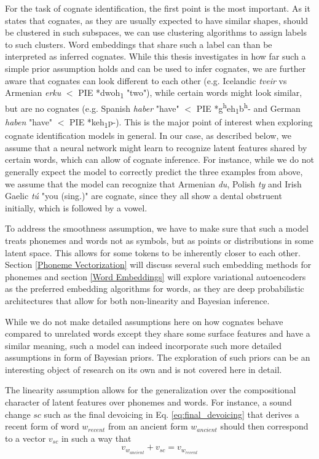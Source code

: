 \documentclass[6pt]{article}
\begin{document}
For the task of cognate identification, the first point is the most important. As it states that cognates, as they are usually expected to have similar shapes, should be clustered in such subspaces, we can use clustering algorithms to assign labels to such clusters. Word embeddings that share such a label can than be interpreted as inferred cognates. While this thesis investigates in how far such a simple prior assumption holds and can be used to infer cognates, we are further aware that cognates can look different to each other (e.g. Icelandic \textit{tveir} vs Armenian \textit{erku} $<$ PIE *dwoh\textsubscript{1} "two"), while certain words might look similar, but are no cognates (e.g. Spanish \textit{haber} "have" $<$ PIE *g\textsuperscript{h}eh\textsubscript{1}b\textsuperscript{h}- and German \textit{haben} "have" $<$ PIE *keh\textsubscript{1}p-). This is the major point of interest when exploring cognate identification models in general. In our case, as described below, we assume that a neural network might learn to recognize latent features shared by certain words, which can allow of cognate inference. For instance, while we do not generally expect the model to correctly predict the three examples from above, we assume that the model can recognize that Armenian \textit{du}, Polish \textit{ty} and Irish Gaelic \textit{tú} "you (sing.)" are cognate, since they all show a dental obstruent initially, which is followed by a vowel. 

To address the smoothness assumption, we have to make sure that such a model treats phonemes and words not as symbols, but as points or distributions in some latent space. This allows for some tokens to be inherently closer to each other. Section \ref{Phoneme Vectorization} will discuss several such embedding methods for phonemes and section \ref{Word Embeddings} will explore variational autoencoders \citep{kingma2013auto} as the preferred embedding algorithms for words, as they are deep probabilistic architectures that allow for both non-linearity and Bayesian inference. 

While we do not make detailed assumptions here on how cognates behave compared to unrelated words except they share some surface features and have a similar meaning, such a model can indeed incorporate such more detailed assumptions in form of Bayesian priors. The exploration of such priors can be an interesting object of research on its own and is not covered here in detail.

The linearity assumption allows for the generalization over the compositional character of latent features over phonemes and words. For instance, a sound change $sc$ such as the final devoicing in Eq. \ref{eq:final_devoicing} that derives a recent form of word $w_{recent}$ from an ancient form  $w_{ancient}$ should then correspond to a vector $v_{sc}$ in such a way that 
\begin{equation}
\label{eq:sound_change_linear_dependency}
v_{w_{ancient}}+v_{sc} = v_{w_{recent}}
\end{equation}
\end{document}
